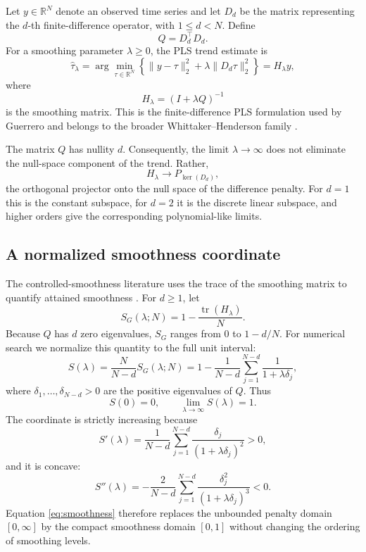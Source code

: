 \documentclass[english]{smcca}
\newcommand{\R}{\mathbb{R}}
\newcommand{\tr}{\operatorname{tr}}
\begin{document}
Let \(y\in\R^N\) denote an observed time series and let \(D_d\) be the matrix representing the \(d\)-th finite-difference operator, with \(1\le d<N\). Define
\[
Q=D_d^\top D_d.
\]
For a smoothing parameter \(\lambda\ge0\), the PLS trend estimate is
\begin{equation}
\widehat{\tau}_\lambda
=
\arg\min_{\tau\in\R^N}
\left\{
\|y-\tau\|_2^2
+
\lambda\|D_d\tau\|_2^2
\right\}
=
H_\lambda y,
\label{eq:pls}
\end{equation}
where
\begin{equation}
H_\lambda=(I+\lambda Q)^{-1}
\label{eq:smoother}
\end{equation}
is the smoothing matrix. This is the finite-difference PLS formulation used by Guerrero \cite{guerrero2007penalized} and belongs to the broader Whittaker--Henderson family \cite{whittaker1923graduation,weinert2007wh}.

The matrix \(Q\) has nullity \(d\). Consequently, the limit \(\lambda\to\infty\) does not eliminate the null-space component of the trend. Rather,
\[
H_\lambda
\longrightarrow
P_{\ker(D_d)},
\]
the orthogonal projector onto the null space of the difference penalty. For \(d=1\) this is the constant subspace, for \(d=2\) it is the discrete linear subspace, and higher orders give the corresponding polynomial-like limits.

\subsection{A normalized smoothness coordinate}

The controlled-smoothness literature uses the trace of the smoothing matrix to quantify attained smoothness \cite{guerrero2008smoothness,cortes2017smoothness}. For \(d\ge1\), let
\[
S_G(\lambda;N)
=
1-\frac{\tr(H_\lambda)}{N}.
\]
Because \(Q\) has \(d\) zero eigenvalues, \(S_G\) ranges from \(0\) to \(1-d/N\). For numerical search we normalize this quantity to the full unit interval:
\begin{equation}
S(\lambda)
=
\frac{N}{N-d}S_G(\lambda;N)
=
1-
\frac{1}{N-d}
\sum_{j=1}^{N-d}
\frac{1}{1+\lambda\delta_j},
\label{eq:smoothness}
\end{equation}
where \(\delta_1,\ldots,\delta_{N-d}>0\) are the positive eigenvalues of \(Q\). Thus
\[
S(0)=0,
\qquad
\lim_{\lambda\to\infty}S(\lambda)=1.
\]
The coordinate is strictly increasing because
\begin{equation}
S'(\lambda)
=
\frac{1}{N-d}
\sum_{j=1}^{N-d}
\frac{\delta_j}{(1+\lambda\delta_j)^2}
>0,
\label{eq:sprime}
\end{equation}
and it is concave:
\begin{equation}
S''(\lambda)
=
-\frac{2}{N-d}
\sum_{j=1}^{N-d}
\frac{\delta_j^2}{(1+\lambda\delta_j)^3}
<0.
\label{eq:ssecond}
\end{equation}
Equation \eqref{eq:smoothness} therefore replaces the unbounded penalty domain \([0,\infty]\) by the compact smoothness domain \([0,1]\) without changing the ordering of smoothing levels.
\end{document}

